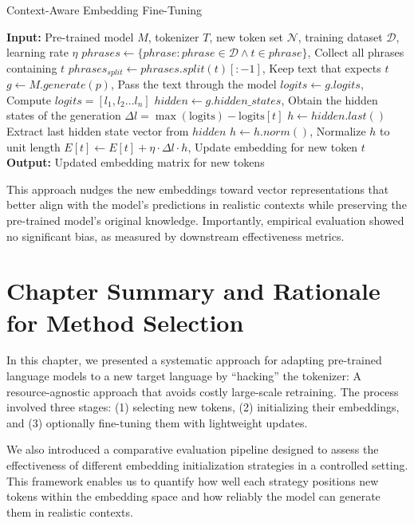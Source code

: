 \begin{algorithm}[H]
\caption{Context-Aware Embedding Fine-Tuning}
\begin{algorithmic}[1]
\State \textbf{Input:} Pre-trained model $M$, tokenizer $T$, new token set $\mathcal{N}$, training dataset $\mathcal{D}$, learning rate $\eta$
    \State $phrases \gets \{phrase: phrase\in\mathcal{D} \wedge  t \in phrase\}$, Collect all phrases containing $t$
        \State $phrases_{split} \gets phrases.split(t)[:-1]$, Keep text that expects $t$
            \State $g \gets M.generate(p)$, Pass the text through the model
            \State $logits \gets g.logits$, Compute $logits=[l_1, l_2 \dots l_n]$
            \State $hidden \gets g.hidden\_states$, Obtain the hidden states of the generation
            \State $\Delta l = \max(\text{logits}) - \text{logits}[t]$
            \State $h \gets hidden.last()$ Extract last hidden state vector from $hidden$
            \State $h \gets h.norm()$, Normalize $h$ to unit length
            \State $E[t] \gets E[t] + \eta \cdot \Delta l \cdot h$, Update embedding for new token $t$
        \EndFor
    \EndFor
\EndFor
\State \textbf{Output:} Updated embedding matrix for new tokens
\end{algorithmic}
\end{algorithm}

\newpage

This approach nudges the new embeddings toward vector representations that better align with the model's predictions in realistic contexts while preserving the pre-trained model's original knowledge. Importantly, empirical evaluation showed no significant bias, as measured by downstream effectiveness metrics.




\section{Chapter Summary and Rationale for Method Selection}

In this chapter, we presented a systematic approach for adapting pre-trained language models to a new target language by “hacking” the tokenizer: A resource-agnostic approach that avoids costly large-scale retraining. The process involved three stages: (1) selecting new tokens, (2) initializing their embeddings, and (3) optionally fine-tuning them with lightweight updates. 

We also introduced a comparative evaluation pipeline designed to assess the effectiveness of different embedding initialization strategies in a controlled setting. This framework enables us to quantify how well each strategy positions new tokens within the embedding space and how reliably the model can generate them in realistic contexts.


